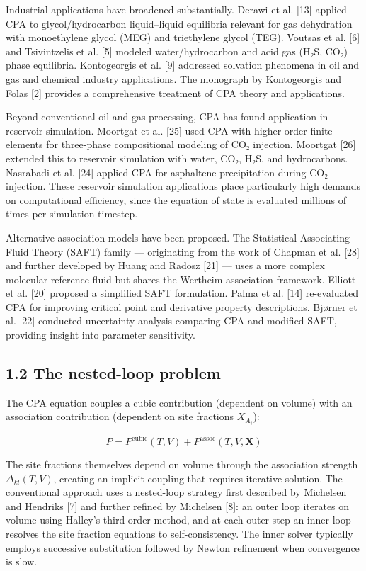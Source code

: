 \documentclass[review,3p]{elsarticle}
\begin{document}
Industrial applications have broadened substantially. Derawi et al. [13] applied CPA to glycol/hydrocarbon liquid–liquid equilibria relevant for gas dehydration with monoethylene glycol (MEG) and triethylene glycol (TEG). Voutsas et al. [6] and Tsivintzelis et al. [5] modeled water/hydrocarbon and acid gas (H₂S, CO₂) phase equilibria. Kontogeorgis et al. [9] addressed solvation phenomena in oil and gas and chemical industry applications. The monograph by Kontogeorgis and Folas [2] provides a comprehensive treatment of CPA theory and applications.

Beyond conventional oil and gas processing, CPA has found application in reservoir simulation. Moortgat et al. [25] used CPA with higher-order finite elements for three-phase compositional modeling of CO₂ injection. Moortgat [26] extended this to reservoir simulation with water, CO₂, H₂S, and hydrocarbons. Nasrabadi et al. [24] applied CPA for asphaltene precipitation during CO₂ injection. These reservoir simulation applications place particularly high demands on computational efficiency, since the equation of state is evaluated millions of times per simulation timestep.

Alternative association models have been proposed. The Statistical Associating Fluid Theory (SAFT) family — originating from the work of Chapman et al. [28] and further developed by Huang and Radosz [21] — uses a more complex molecular reference fluid but shares the Wertheim association framework. Elliott et al. [20] proposed a simplified SAFT formulation. Palma et al. [14] re-evaluated CPA for improving critical point and derivative property descriptions. Bjørner et al. [22] conducted uncertainty analysis comparing CPA and modified SAFT, providing insight into parameter sensitivity.

\subsection{1.2 The nested-loop problem}

The CPA equation couples a cubic contribution (dependent on volume) with an association contribution (dependent on site fractions $X_{A_i}$):

\begin{equation}

P = P^{\text{cubic}}(T, V) + P^{\text{assoc}}(T, V, \mathbf{X})

\end{equation}

The site fractions themselves depend on volume through the association strength $\Delta_{kl}(T, V)$, creating an implicit coupling that requires iterative solution. The conventional approach uses a nested-loop strategy first described by Michelsen and Hendriks [7] and further refined by Michelsen [8]: an outer loop iterates on volume using Halley's third-order method, and at each outer step an inner loop resolves the site fraction equations to self-consistency. The inner solver typically employs successive substitution followed by Newton refinement when convergence is slow.
\end{document}
